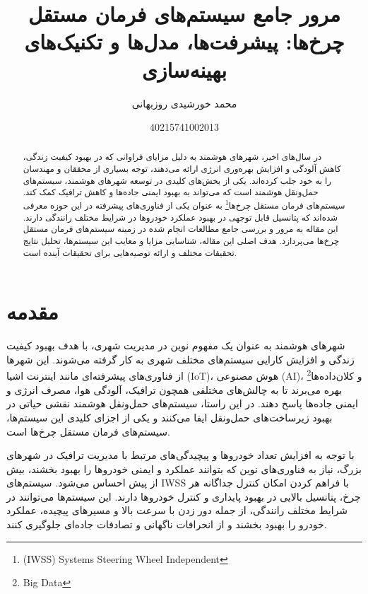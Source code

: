 \documentclass[a4paper,10pt]{article}
\title{مرور جامع سیستم‌های فرمان مستقل چرخ‌ها: پیشرفت‌ها، مدل‌ها و تکنیک‌های بهینه‌سازی}
\author{محمد خورشیدی روزبهانی\and 40215741002013}
\date{}
\begin{document}
    \maketitle

    \begin{abstract}
        
        در سال‌های اخیر، شهرهای هوشمند به دلیل مزایای فراوانی که در بهبود کیفیت زندگی، کاهش آلودگی و افزایش بهره‌وری انرژی ارائه می‌دهند، توجه بسیاری از محققان و مهندسان را به خود جلب کرده‌اند. یکی از بخش‌های کلیدی در توسعه شهرهای هوشمند، سیستم‌های حمل‌ونقل هوشمند است که می‌تواند به بهبود ایمنی جاده‌ها و کاهش ترافیک کمک کند. سیستم‌های فرمان مستقل چرخ‌ها\footnote{\hspace{2pt}(IWSS) Systems Steering Wheel Independent} به عنوان یکی از فناوری‌های پیشرفته در این حوزه معرفی شده‌اند که پتانسیل قابل توجهی در بهبود عملکرد خودروها در شرایط مختلف رانندگی دارند. این مقاله به مرور و بررسی جامع مطالعات انجام شده در زمینه سیستم‌های فرمان مستقل چرخ‌ها می‌پردازد. هدف اصلی این مقاله، شناسایی مزایا و معایب این سیستم‌ها، تحلیل نتایج تحقیقات مختلف و ارائه توصیه‌هایی برای تحقیقات آینده است.

    \end{abstract}
    
    \section{مقدمه}

        شهرهای هوشمند به عنوان یک مفهوم نوین در مدیریت شهری، با هدف بهبود کیفیت زندگی و افزایش کارایی سیستم‌های مختلف شهری به کار گرفته می‌شوند. این شهرها از فناوری‌های پیشرفته‌ای مانند اینترنت اشیا (IoT)، هوش مصنوعی (AI)، و کلان‌داده‌ها\footnote{\hspace{2pt}Big Data} بهره می‌برند تا به چالش‌های مختلفی همچون ترافیک، آلودگی هوا، مصرف انرژی و ایمنی جاده‌ها پاسخ دهند. در این راستا، سیستم‌های حمل‌ونقل هوشمند نقشی حیاتی در بهبود زیرساخت‌های حمل‌ونقل ایفا می‌کنند و یکی از اجزای کلیدی این سیستم‌ها، سیستم‌های فرمان مستقل چرخ‌ها است.

        با توجه به افزایش تعداد خودروها و پیچیدگی‌های مرتبط با مدیریت ترافیک در شهرهای بزرگ، نیاز به فناوری‌های نوین که بتوانند عملکرد و ایمنی خودروها را بهبود بخشند، بیش از پیش احساس می‌شود. سیستم‌های IWSS با فراهم کردن امکان کنترل جداگانه هر چرخ، پتانسیل بالایی در بهبود پایداری و کنترل خودروها دارند. این سیستم‌ها می‌توانند در شرایط مختلف رانندگی، از جمله دور زدن با سرعت بالا و مسیرهای پیچیده، عملکرد خودرو را بهبود بخشند و از انحرافات ناگهانی و تصادفات جاده‌ای جلوگیری کنند.
\end{document}

